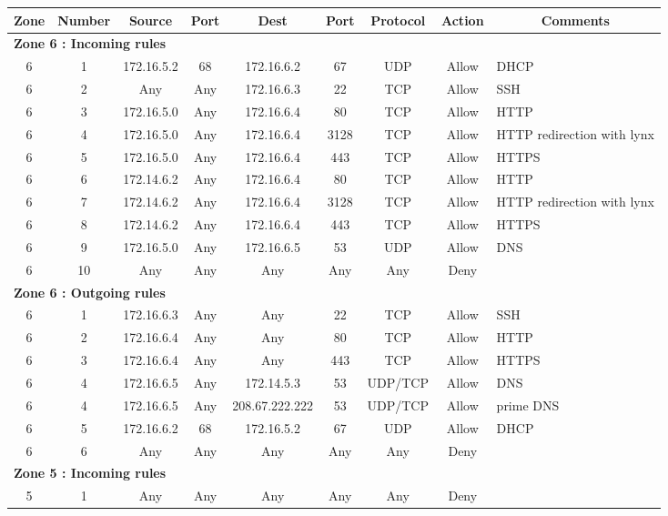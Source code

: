 \documentclass[a4paper,titlepage]{article}
\begin{document}
\begin{table}[h]
	\center
	\begin{tabular}{c|c|cc|cc|ccl}
		Zone & Number & Source & Port & Dest & Port & Protocol & Action & \multicolumn{1}{c}{Comments}\\
		\hline
		\multicolumn{9}{l}{\textbf{Zone 6 : Incoming rules}}\\
		6 & 1 & 172.16.5.2 & 68 & 172.16.6.2 & 67 & UDP & Allow & DHCP \\
		6 & 2 & Any & Any & 172.16.6.3 & 22 & TCP & Allow & SSH \\
		6 & 3 & 172.16.5.0 & Any & 172.16.6.4 & 80 & TCP & Allow & HTTP \\
		6 & 4 & 172.16.5.0 & Any & 172.16.6.4 & 3128 & TCP & Allow & HTTP redirection with lynx \\
		6 & 5 & 172.16.5.0 & Any & 172.16.6.4 & 443 & TCP & Allow & HTTPS \\
		6 & 6 & 172.14.6.2 & Any & 172.16.6.4 & 80 & TCP & Allow & HTTP \\
		6 & 7 & 172.14.6.2 & Any & 172.16.6.4 & 3128 & TCP & Allow & HTTP redirection with lynx  \\
		6 & 8 & 172.14.6.2 & Any & 172.16.6.4 & 443 & TCP & Allow & HTTPS \\
		6 & 9 & 172.16.5.0 & Any & 172.16.6.5 & 53 & UDP & Allow & DNS \\
		6 & 10 & Any & Any & Any & Any & Any & Deny & \\

		\hline
		\multicolumn{9}{l}{\textbf{Zone 6 : Outgoing rules}}\\

		6 & 1 & 172.16.6.3 & Any & Any & 22 & TCP & Allow & SSH\\
		6 & 2 & 172.16.6.4 & Any & Any & 80 & TCP & Allow & HTTP\\
		6 & 3 & 172.16.6.4 & Any & Any & 443 & TCP & Allow & HTTPS\\
		6 & 4 & 172.16.6.5 & Any & 172.14.5.3 & 53 & UDP/TCP & Allow & DNS \\
		6 & 4 & 172.16.6.5 & Any & 208.67.222.222 & 53 & UDP/TCP & Allow & prime DNS \\
		6 & 5 & 172.16.6.2 & 68 & 172.16.5.2 & 67 & UDP & Allow & DHCP \\
		6 & 6 & Any & Any & Any & Any & Any & Deny & \\
		\hline
		\multicolumn{9}{l}{\textbf{Zone 5 : Incoming rules}}\\
		5 & 1 & Any & Any & Any & Any & Any & Deny & \\


\end{tabular}
\end{table}
\end{document}
